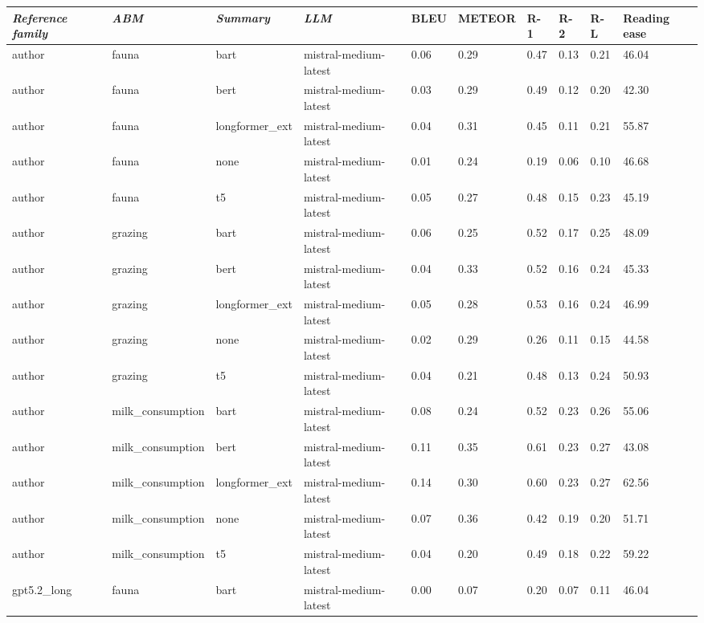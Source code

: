 \begin{tabular}{|l|l|l|l|l|l|l|l|l|l|}
\hline
\textit{\textbf{Reference family}} & \textit{\textbf{ABM}} & \textit{\textbf{Summary}} & \textit{\textbf{LLM}} & BLEU & METEOR & R-1 & R-2 & R-L & Reading ease \\
 \hline
 author & fauna & bart & mistral-medium-latest & 0.06 & 0.29 & 0.47 & 0.13 & 0.21 & 46.04 \\
 \hline
 author & fauna & bert & mistral-medium-latest & 0.03 & 0.29 & 0.49 & 0.12 & 0.20 & 42.30 \\
 \hline
 author & fauna & longformer\_ext & mistral-medium-latest & 0.04 & 0.31 & 0.45 & 0.11 & 0.21 & 55.87 \\
 \hline
 author & fauna & none & mistral-medium-latest & 0.01 & 0.24 & 0.19 & 0.06 & 0.10 & 46.68 \\
 \hline
 author & fauna & t5 & mistral-medium-latest & 0.05 & 0.27 & 0.48 & 0.15 & 0.23 & 45.19 \\
 \hline
 author & grazing & bart & mistral-medium-latest & 0.06 & 0.25 & 0.52 & 0.17 & 0.25 & 48.09 \\
 \hline
 author & grazing & bert & mistral-medium-latest & 0.04 & 0.33 & 0.52 & 0.16 & 0.24 & 45.33 \\
 \hline
 author & grazing & longformer\_ext & mistral-medium-latest & 0.05 & 0.28 & 0.53 & 0.16 & 0.24 & 46.99 \\
 \hline
 author & grazing & none & mistral-medium-latest & 0.02 & 0.29 & 0.26 & 0.11 & 0.15 & 44.58 \\
 \hline
 author & grazing & t5 & mistral-medium-latest & 0.04 & 0.21 & 0.48 & 0.13 & 0.24 & 50.93 \\
 \hline
 author & milk\_consumption & bart & mistral-medium-latest & 0.08 & 0.24 & 0.52 & 0.23 & 0.26 & 55.06 \\
 \hline
 author & milk\_consumption & bert & mistral-medium-latest & 0.11 & 0.35 & 0.61 & 0.23 & 0.27 & 43.08 \\
 \hline
 author & milk\_consumption & longformer\_ext & mistral-medium-latest & 0.14 & 0.30 & 0.60 & 0.23 & 0.27 & 62.56 \\
 \hline
 author & milk\_consumption & none & mistral-medium-latest & 0.07 & 0.36 & 0.42 & 0.19 & 0.20 & 51.71 \\
 \hline
 author & milk\_consumption & t5 & mistral-medium-latest & 0.04 & 0.20 & 0.49 & 0.18 & 0.22 & 59.22 \\
 \hline
 gpt5.2\_long & fauna & bart & mistral-medium-latest & 0.00 & 0.07 & 0.20 & 0.07 & 0.11 & 46.04 \\

\end{tabular}
